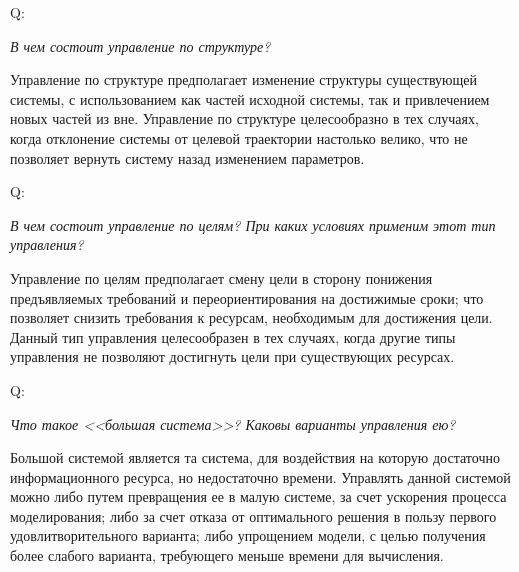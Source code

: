 \documentclass{article}
\newcommand{\question}[2]{
	\begin{flushright}
		Q:\hspace{2ex}\vline\hspace{2ex}
		\begin{minipage}{0.9\textwidth}
			\large
			\textit{#1}
		\end{minipage}
	\end{flushright}
	\begin{center}
		\begin{minipage}{0.95\textwidth}
			#2
		\end{minipage}
	\end{center}
	}
\begin{document}
\question{В чем состоит управление по структуре?}{Управление по структуре предполагает изменение структуры существующей системы, с использованием как частей исходной системы, так и привлечением новых частей из вне. Управление по структуре целесообразно в тех случаях, когда отклонение системы от целевой траектории настолько велико, что не позволяет вернуть систему назад изменением параметров.}
\question{В чем состоит управление по целям? При каких условиях применим этот тип управления?}{Управление по целям предполагает смену цели в сторону понижения предъявляемых требований и переориентирования на достижимые сроки; что позволяет снизить требования к ресурсам, необходимым для достижения цели. Данный тип управления целесообразен в тех случаях, когда другие типы управления не позволяют достигнуть цели при существующих ресурсах.}
\question{Что такое <<большая система>>? Каковы варианты управления ею?}{Большой системой является та система, для воздействия на которую достаточно информационного ресурса, но недостаточно времени. Управлять данной системой можно либо путем превращения ее в малую системе, за счет ускорения процесса моделирования; либо за счет отказа от оптимального решения в пользу первого удовлитворительного варианта; либо упрощением модели, с целью получения более слабого варианта, требующего меньше времени для вычисления.}
\end{document}
